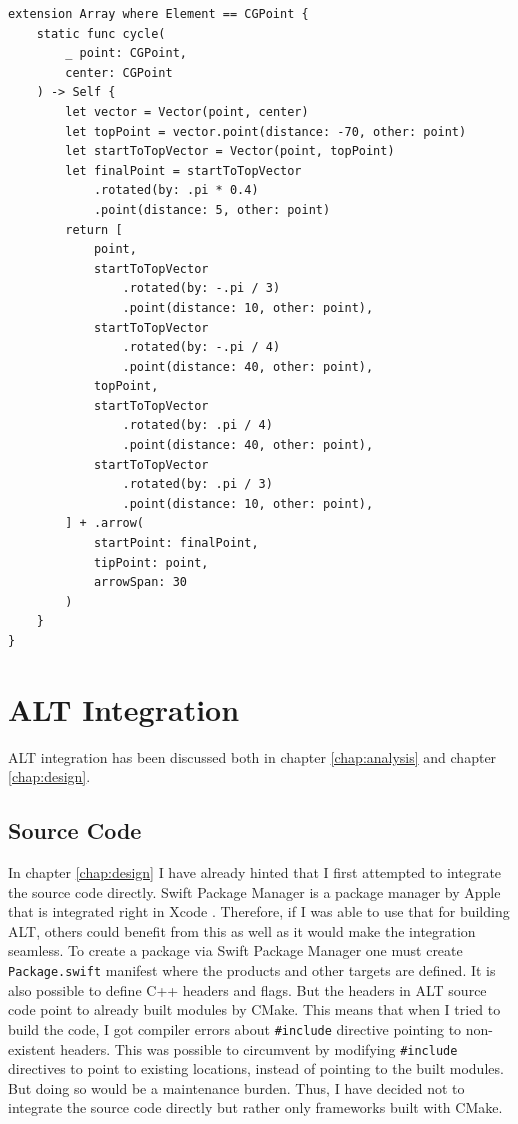 \begin{lstlisting}[caption=Cycle stroke, label=cycle-init]
extension Array where Element == CGPoint {
    static func cycle(
        _ point: CGPoint,
        center: CGPoint
    ) -> Self {
        let vector = Vector(point, center)
        let topPoint = vector.point(distance: -70, other: point)
        let startToTopVector = Vector(point, topPoint)
        let finalPoint = startToTopVector
            .rotated(by: .pi * 0.4)
            .point(distance: 5, other: point)
        return [
            point,
            startToTopVector
                .rotated(by: -.pi / 3)
                .point(distance: 10, other: point),
            startToTopVector
                .rotated(by: -.pi / 4)
                .point(distance: 40, other: point),
            topPoint,
            startToTopVector
                .rotated(by: .pi / 4)
                .point(distance: 40, other: point),
            startToTopVector
                .rotated(by: .pi / 3)
                .point(distance: 10, other: point),
        ] + .arrow(
            startPoint: finalPoint,
            tipPoint: point,
            arrowSpan: 30
        )
    }
}
\end{lstlisting}

\section{ALT Integration}

ALT integration has been discussed both in chapter \ref{chap:analysis} and chapter \ref{chap:design}. 

\subsection{Source Code}
In chapter \ref{chap:design} I have already hinted that I first attempted to integrate the source code directly. Swift Package Manager is a package manager by Apple that is integrated right in Xcode \cite{spm}. Therefore, if I was able to use that for building ALT, others could benefit from this as well as it would make the integration seamless. To create a package via Swift Package Manager one must create \lstinline{Package.swift} manifest where the products and other targets are defined. It is also possible to define C++ headers and flags. But the headers in ALT source code point to already built modules by CMake. This means that when I tried to build the code, I got compiler errors about \lstinline{#include} directive pointing to non-existent headers. This was possible to circumvent by modifying \lstinline{#include} directives to point to existing locations, instead of pointing to the built modules. But doing so would be a maintenance burden. Thus, I have decided not to integrate the source code directly but rather only frameworks built with CMake.

